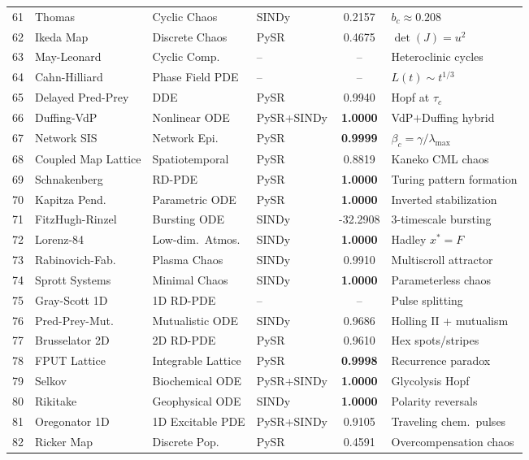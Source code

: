 \begin{table}[t]
\begin{tabular}{rlllcl}
61 & Thomas & Cyclic Chaos & SINDy & 0.2157 & $b_c \approx 0.208$ \\
62 & Ikeda Map & Discrete Chaos & PySR & 0.4675 & $\det(J) = u^2$ \\
63 & May-Leonard & Cyclic Comp. & -- & -- & Heteroclinic cycles \\
64 & Cahn-Hilliard & Phase Field PDE & -- & -- & $L(t) \sim t^{1/3}$ \\
65 & Delayed Pred-Prey & DDE & PySR & 0.9940 & Hopf at $\tau_c$ \\
66 & Duffing-VdP & Nonlinear ODE & PySR+SINDy & \textbf{1.0000} & VdP$+$Duffing hybrid \\
67 & Network SIS & Network Epi. & PySR & \textbf{0.9999} & $\beta_c = \gamma/\lambda_{\max}$ \\
68 & Coupled Map Lattice & Spatiotemporal & PySR & 0.8819 & Kaneko CML chaos \\
69 & Schnakenberg & RD-PDE & PySR & \textbf{1.0000} & Turing pattern formation \\
70 & Kapitza Pend. & Parametric ODE & PySR & \textbf{1.0000} & Inverted stabilization \\
71 & FitzHugh-Rinzel & Bursting ODE & SINDy & -32.2908 & 3-timescale bursting \\
72 & Lorenz-84 & Low-dim.\ Atmos. & SINDy & \textbf{1.0000} & Hadley $x^*{=}F$ \\
73 & Rabinovich-Fab. & Plasma Chaos & SINDy & 0.9910 & Multiscroll attractor \\
74 & Sprott Systems & Minimal Chaos & SINDy & \textbf{1.0000} & Parameterless chaos \\
75 & Gray-Scott 1D & 1D RD-PDE & -- & -- & Pulse splitting \\
76 & Pred-Prey-Mut. & Mutualistic ODE & SINDy & 0.9686 & Holling II + mutualism \\
77 & Brusselator 2D & 2D RD-PDE & PySR & 0.9610 & Hex spots/stripes \\
78 & FPUT Lattice & Integrable Lattice & PySR & \textbf{0.9998} & Recurrence paradox \\
79 & Selkov & Biochemical ODE & PySR+SINDy & \textbf{1.0000} & Glycolysis Hopf \\
80 & Rikitake & Geophysical ODE & SINDy & \textbf{1.0000} & Polarity reversals \\
81 & Oregonator 1D & 1D Excitable PDE & PySR+SINDy & 0.9105 & Traveling chem.\ pulses \\
82 & Ricker Map & Discrete Pop. & PySR & 0.4591 & Overcompensation chaos \\

\end{tabular}
\end{table}
